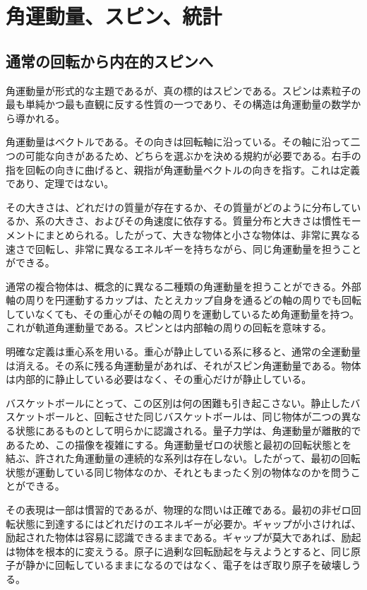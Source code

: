 \chapter{角運動量、スピン、統計}

\section{通常の回転から内在的スピンへ}

角運動量が形式的な主題であるが、真の標的はスピンである。スピンは素粒子の最も単純かつ最も直観に反する性質の一つであり、その構造は角運動量の数学から導かれる。

角運動量はベクトルである。その向きは回転軸に沿っている。その軸に沿って二つの可能な向きがあるため、どちらを選ぶかを決める規約が必要である。右手の指を回転の向きに曲げると、親指が角運動量ベクトルの向きを指す。これは定義であり、定理ではない。

その大きさは、どれだけの質量が存在するか、その質量がどのように分布しているか、系の大きさ、およびその角速度に依存する。質量分布と大きさは慣性モーメントにまとめられる。したがって、大きな物体と小さな物体は、非常に異なる速さで回転し、非常に異なるエネルギーを持ちながら、同じ角運動量を担うことができる。

通常の複合物体は、概念的に異なる二種類の角運動量を担うことができる。外部軸の周りを円運動するカップは、たとえカップ自身を通るどの軸の周りでも回転していなくても、その重心がその軸の周りを運動しているため角運動量を持つ。これが軌道角運動量である。スピンとは内部軸の周りの回転を意味する。

明確な定義は重心系を用いる。重心が静止している系に移ると、通常の全運動量は消える。その系に残る角運動量があれば、それがスピン角運動量である。物体は内部的に静止している必要はなく、その重心だけが静止している。

バスケットボールにとって、この区別は何の困難も引き起こさない。静止したバスケットボールと、回転させた同じバスケットボールは、同じ物体が二つの異なる状態にあるものとして明らかに認識される。量子力学は、角運動量が離散的であるため、この描像を複雑にする。角運動量ゼロの状態と最初の回転状態とを結ぶ、許された角運動量の連続的な系列は存在しない。したがって、最初の回転状態が運動している同じ物体なのか、それともまったく別の物体なのかを問うことができる。

その表現は一部は慣習的であるが、物理的な問いは正確である。最初の非ゼロ回転状態に到達するにはどれだけのエネルギーが必要か。ギャップが小さければ、励起された物体は容易に認識できるままである。ギャップが莫大であれば、励起は物体を根本的に変えうる。原子に過剰な回転励起を与えようとすると、同じ原子が静かに回転しているままになるのではなく、電子をはぎ取り原子を破壊しうる。

